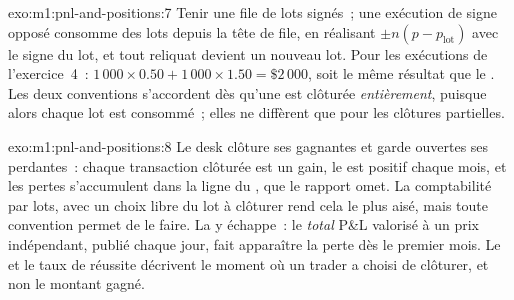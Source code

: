 \begin{solution}{exo:m1:pnl-and-positions:7}
Tenir une file de lots signés~; une exécution de signe opposé consomme des lots depuis la
tête de file, en réalisant $\pm n(p - p_{\text{lot}})$ avec le signe du lot, et
tout reliquat devient un nouveau lot. Pour les exécutions de l'exercice~4~: $1\,000\times0.50 +
1\,000\times1.50 = \$2\,000$, soit le même résultat que le . Les deux conventions
s'accordent dès qu'une  est clôturée \emph{entièrement}, puisque alors chaque lot est
consommé~; elles ne diffèrent que pour les clôtures partielles.
\end{solution}

\begin{solution}{exo:m1:pnl-and-positions:8}
Le desk clôture ses  gagnantes et garde ouvertes ses  perdantes~: chaque transaction clôturée est
un gain, le  est positif chaque mois, et les pertes s'accumulent dans
la ligne du , que le rapport omet. La comptabilité par lots, avec un choix libre
du lot à clôturer rend cela le plus aisé, mais toute convention permet
de le faire. La  y échappe~: le \emph{total}
P\&L valorisé à un prix indépendant, publié chaque jour, fait apparaître la perte dès le
premier mois. Le  et le taux de réussite décrivent le moment où un trader
a choisi de clôturer, et non le montant gagné.
\end{solution}

